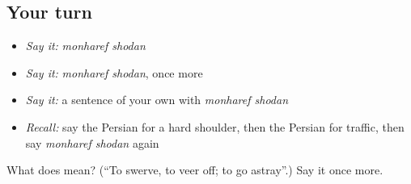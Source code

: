 \subsection*{Your turn}
\begin{itemize}
\raggedright
  \item \emph{Say it:} \emph{monharef shodan}
  \item \emph{Say it:} \emph{monharef shodan}, once more
  \item \emph{Say it:} a sentence of your own with \emph{monharef shodan}
  \item \emph{Recall:} say the Persian for a hard shoulder, then the Persian for traffic, then say \emph{monharef shodan} again
\end{itemize}

\begin{tcolorbox}[breakable,colback=teal!4,colframe=teal!35!black,title={Before you move on}]
What does   mean? (\textquotedblleft{}To swerve, to veer off; to go astray\textquotedblright{}.) Say it once more.
\end{tcolorbox}
